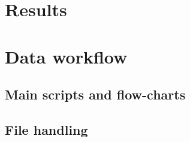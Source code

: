 \documentclass[paper=a4, fontsize=11pt]{scrartcl} %
\numberwithin{equation}{section} %
\numberwithin{figure}{section} %
\numberwithin{table}{section} %
\begin{document}




\newpage
\section{Results}




\newpage
\section{Data workflow}

\subsection{Main scripts and flow-charts}
\label{subsec:scripts}


\subsection{File handling}
\label{subsec:files}





\newpage

\end{document}
